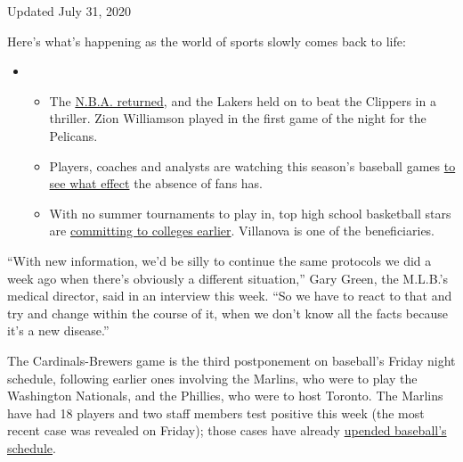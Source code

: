 Updated July 31, 2020

Here's what's happening as the world of sports slowly comes back to
life:

\begin{itemize}
\item
  \begin{itemize}
  \tightlist
  \item
    The
    \href{https://www.nytimes3xbfgragh.onion/2020/07/30/sports/basketball/clippers-lakers.html?action=click\&pgtype=Article\&state=default\&region=MAIN_CONTENT_2\&context=storylines_keepup}{N.B.A.
    returned}, and the Lakers held on to beat the Clippers in a
    thriller. Zion Williamson played in the first game of the night for
    the Pelicans.
  \item
    Players, coaches and analysts are watching this season's baseball
    games
    \href{https://www.nytimes3xbfgragh.onion/2020/07/31/sports/baseball/baseball-empty-stadiums-effects.html?action=click\&pgtype=Article\&state=default\&region=MAIN_CONTENT_2\&context=storylines_keepup}{to
    see what effect} the absence of fans has.
  \item
    With no summer tournaments to play in, top high school basketball
    stars are
    \href{https://www.nytimes3xbfgragh.onion/2020/07/30/sports/ncaabasketball/college-basketball-recruiting.html?action=click\&pgtype=Article\&state=default\&region=MAIN_CONTENT_2\&context=storylines_keepup}{committing
    to colleges earlier}. Villanova is one of the beneficiaries.
  \end{itemize}
\end{itemize}

``With new information, we'd be silly to continue the same protocols we
did a week ago when there's obviously a different situation,'' Gary
Green, the M.L.B.'s medical director, said in an interview this week.
``So we have to react to that and try and change within the course of
it, when we don't know all the facts because it's a new disease.''

The Cardinals-Brewers game is the third postponement on baseball's
Friday night schedule, following earlier ones involving the Marlins, who
were to play the Washington Nationals, and the Phillies, who were to
host Toronto. The Marlins have had 18 players and two staff members test
positive this week (the most recent case was revealed on Friday); those
cases have already
\href{https://www.nytimes3xbfgragh.onion/2020/07/28/sports/baseball/marlins-outbreak-mlb-coronavirus.html}{upended
baseball's schedule}.

